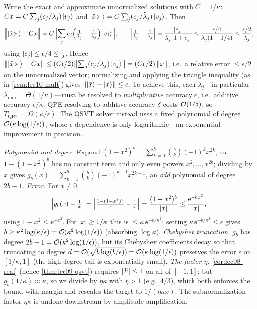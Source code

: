 \begin{solution}
Write the exact and approximate unnormalized solutions with $C=1/\kappa$:
$C x=C\sum_j (c_j/\lambda_j)\ket{v_j}$ and $\ket{\tilde x\!\succ}=C\sum_j
(c_j/\tilde\lambda_j)\ket{v_j}$. Then
\[
  \Bigl\|\ket{\tilde x\!\succ}-Cx\Bigr\|
  =C\Bigl\|\sum_j c_j\Bigl(\tfrac1{\tilde\lambda_j}-\tfrac1{\lambda_j}\Bigr)\ket{v_j}
  \Bigr\|,\qquad
  \Bigl|\tfrac1{\tilde\lambda_j}-\tfrac1{\lambda_j}\Bigr|
  =\frac{\left\lvert e_j \right\rvert}{\lambda_j\left\lvert 1+e_j \right\rvert}\le\frac{\epsilon/4}{\lambda_j(1-1/4)}
  \le\frac{\epsilon/2}{\lambda_j},
\]
using $\left\lvert e_j \right\rvert\le\epsilon/4\le\tfrac12$. Hence
$\left\lVert \ket{\tilde x\!\succ}-Cx \right\rVert\le(C\epsilon/2)\bigl\|\sum_j(c_j/\lambda_j)\ket{v_j}
\bigr\|=(C\epsilon/2)\left\lVert x \right\rVert$, i.e.\ a relative error $\le\epsilon/2$ on the
unnormalized vector; normalizing and applying the triangle inequality (as in
\cref{rem:lec10-mult}) gives $\left\lVert \ket{\tilde x}-\ket x \right\rVert\le\epsilon$. To achieve this,
each $\lambda_j$---in particular $\lambda_{\min}=\Theta(1/\kappa)$---must be resolved to
\emph{multiplicative} accuracy $\epsilon$, i.e.\ additive accuracy $\epsilon/\kappa$. QPE
resolving to additive accuracy $\delta$ costs $\mathcal{O}(1/\delta)$, so
$T_{\mathrm{QPE}}=\Omega(\kappa/\epsilon)$. The QSVT solver instead uses a fixed
polynomial of degree $\mathcal{O}(\kappa\log(1/\epsilon))$, whose $\epsilon$ dependence is only
logarithmic---an exponential improvement in precision.
\end{solution}

\begin{solution}
\emph{Polynomial and degree.} Expand $(1-x^2)^b=\sum_{k=0}^b\binom bk(-1)^k x^{2k}$, so
$1-(1-x^2)^b$ has no constant term and only even powers $x^2,\dots,x^{2b}$; dividing by
$x$ gives $g_b(x)=\sum_{k=1}^b\binom bk(-1)^{k-1}x^{2k-1}$, an \emph{odd} polynomial of
degree $2b-1$. \emph{Error.} For $x\neq0$,
\[
  \Bigl|g_b(x)-\tfrac1x\Bigr|=\Bigl|\tfrac{1-(1-x^2)^b}{x}-\tfrac1x\Bigr|
  =\frac{(1-x^2)^b}{\left\lvert x \right\rvert}\le\frac{\mathrm{e}^{-bx^2}}{\left\lvert x \right\rvert},
\]
using $1-x^2\le\ee^{-x^2}$. For $\left\lvert x \right\rvert\ge1/\kappa$ this is $\le\kappa\,\ee^{-b/\kappa^2}$;
setting $\kappa\,\ee^{-b/\kappa^2}\le\epsilon$ gives $b\ge\kappa^2\log(\kappa/\epsilon)
=\mathcal{O}(\kappa^2\log(1/\epsilon))$ (absorbing $\log\kappa$). \emph{Chebyshev truncation.}
$g_b$ has degree $2b-1=\mathcal{O}(\kappa^2\log(1/\epsilon))$, but its Chebyshev coefficients
decay so that truncating to degree $d=\mathcal{O}(\sqrt{b\log(b/\epsilon)})=\mathcal{O}(\kappa\log
(1/\epsilon))$ preserves the error $\epsilon$ on $[1/\kappa,1]$ (the high-degree tail is
exponentially small). \emph{The factor $\eta$.} \cref{cor:lec08-real} (hence
\cref{thm:lec09-qsvt}) requires $\left\lvert P \right\rvert\le1$ on all of $[-1,1]$; but
$g_b(1/\kappa)\approx\kappa$, so we divide by $\eta\kappa$ with $\eta>1$ (e.g.\ $4/3$),
which both enforces the bound with margin and rescales the target to $1/(\eta\kappa x)$.
The subnormalization factor $\eta\kappa$ is undone downstream by amplitude amplification.
\end{solution}

